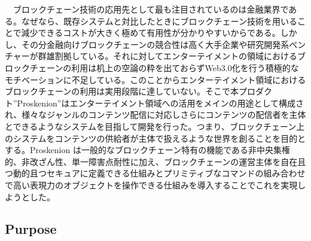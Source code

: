 　ブロックチェーン技術の応用先として最も注目されているのは金融業界である。なぜなら、既存システムと対比したときにブロックチェーン技術を用いることで減少できるコストが大きく極めて有用性が分かりやすいからである。しかし、その分金融向けブロックチェーンの競合性は高く大手企業や研究開発系ベンチャーが群雄割拠している。それに対してエンターテイメントの領域におけるブロックチェーンの利用は机上の空論の粋を出ておらずWeb3.0化を行う積極的なモチベーションに不足している。このことからエンターテイメント領域におけるブロックチェーンの利用は実用段階に達していない。そこで本プロダクト''Proskenion''はエンターテイメント領域への活用をメインの用途として構成され、様々なジャンルのコンテンツ配信に対応しさらにコンテンツの配信者を主体とできるようなシステムを目指して開発を行った。つまり、ブロックチェーン上のシステムをコンテンツの供給者が主体で扱えるような世界を創ることを目的とする。Proskenion
は一般的なブロックチェーン特有の機能である非中央集権的、非改ざん性、単一障害点耐性に加え、ブロックチェーンの運営主体を自在且つ動的且つセキュアに定義できる仕組みとプリミティブなコマンドの組み合わせで高い表現力のオブジェクトを操作できる仕組みを導入することでこれを実現しようとした。

\hypertarget{purpose}{%
\subsection{Purpose}\label{purpose}}

